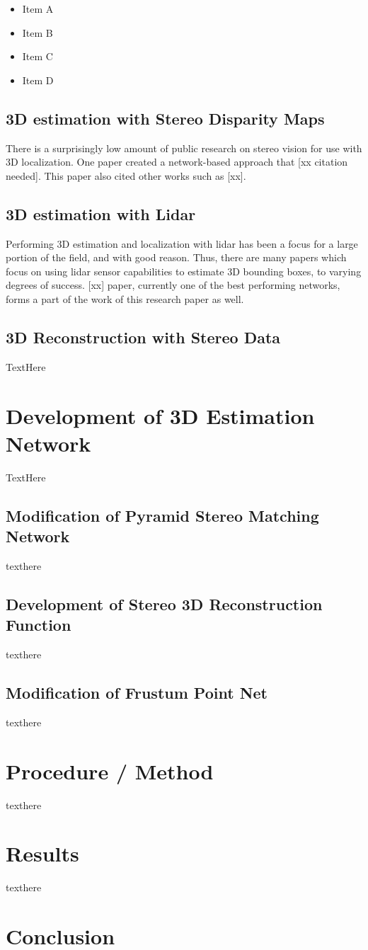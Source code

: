 \begin{itemize} \itemsep=-0.5em
    \item Item A
    \item Item B
    \item Item C
    \item Item D
    
\end{itemize}

\subsection{3D estimation with Stereo Disparity Maps}
There is a surprisingly low amount of public research on stereo vision for use with 3D localization. One paper created a network-based approach that [xx citation needed]. This paper also cited other works such as [xx].

\subsection{3D estimation with Lidar}
Performing 3D estimation and localization with lidar has been a focus for a large portion of the field, and with good reason. Thus, there are many papers which focus on using lidar sensor capabilities to estimate 3D bounding boxes, to varying degrees of success. [xx] paper, currently one of the best performing networks, forms a part of the work of this research paper as well. 

\subsection{3D Reconstruction with Stereo Data}
TextHere

\section{Development of 3D Estimation Network}
TextHere

\subsection{Modification of Pyramid Stereo Matching Network}
texthere

\subsection{Development of Stereo 3D Reconstruction Function}
texthere

\subsection{Modification of Frustum Point Net}
texthere

\section{Procedure / Method}
texthere

\section{Results}
texthere

\section{Conclusion}

